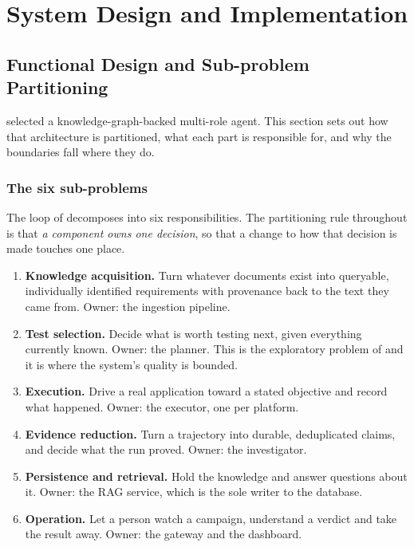 \chapter{System Design and Implementation}
\label{ch:design}

\section{Functional Design and Sub-problem Partitioning}
\label{sec:architecture}

 selected a knowledge-graph-backed multi-role agent. This
section sets out how that architecture is partitioned, what each part is
responsible for, and why the boundaries fall where they do.

\subsection{The six sub-problems}

The loop of  decomposes into six responsibilities.
The partitioning rule throughout is that \emph{a component owns one decision},
so that a change to how that decision is made touches one place.

\begin{enumerate}[label=\textbf{S\arabic*.},leftmargin=3.0em]
  \item \textbf{Knowledge acquisition.} Turn whatever documents exist into
    queryable, individually identified requirements with provenance back to the
    text they came from. Owner: the ingestion pipeline.
  \item \textbf{Test selection.} Decide what is worth testing next, given
    everything currently known. Owner: the planner. This is the exploratory
    problem of  and it is where the system's quality is
    bounded.
  \item \textbf{Execution.} Drive a real application toward a stated objective
    and record what happened. Owner: the executor, one per platform.
  \item \textbf{Evidence reduction.} Turn a trajectory into durable,
    deduplicated claims, and decide what the run proved. Owner: the
    investigator.
  \item \textbf{Persistence and retrieval.} Hold the knowledge and answer
    questions about it. Owner: the RAG service, which is the sole writer to the
    database.
  \item \textbf{Operation.} Let a person watch a campaign, understand a verdict
    and take the result away. Owner: the gateway and the dashboard.
\end{enumerate}

